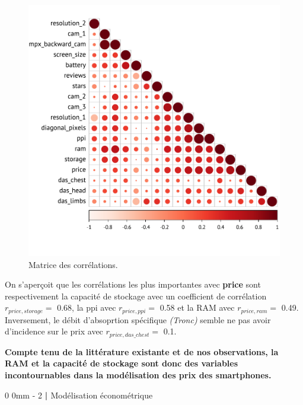 \documentclass[
  12pt,
]{report}
\makeatletter
\renewcommand{\chapter}{%
    \clearpage %
    \@startsection{chapter}%
    {0} %
    {0mm} %
    {-\baselineskip} %
    {2\baselineskip} %
    {\normalfont\Huge\bfseries | \Huge\bfseries}%
}
\makeatother
\begin{document}
\begin{figure}[H]

{\centering \includegraphics{report_files/figure-pdf/correlation-1.pdf}

}

\caption{Matrice des corrélations.}

\end{figure}%

On s'aperçoit que les corrélations les plus importantes avec
\textbf{price} sont respectivement la capacité de stockage avec un
coefficient de corrélation \(r_{price, storage}=\) 0.68, la ppi avec
\(r_{price, ppi}=\) 0.58 et la RAM avec \(r_{price, ram}=\) 0.49.
Inversement, le débit d'absoprtion spécifique \emph{(Tronc)} semble ne
pas avoir d'incidence sur le prix avec \(r_{price, das\_chest}=\) 0.1.

\textbf{Compte tenu de la littérature existante et de nos observations,
la RAM et la capacité de stockage sont donc des variables
incontournables dans la modélisation des prix des smartphones.}

\chapter{Modélisation
économétrique}\label{moduxe9lisation-uxe9conomuxe9trique}
\end{document}
